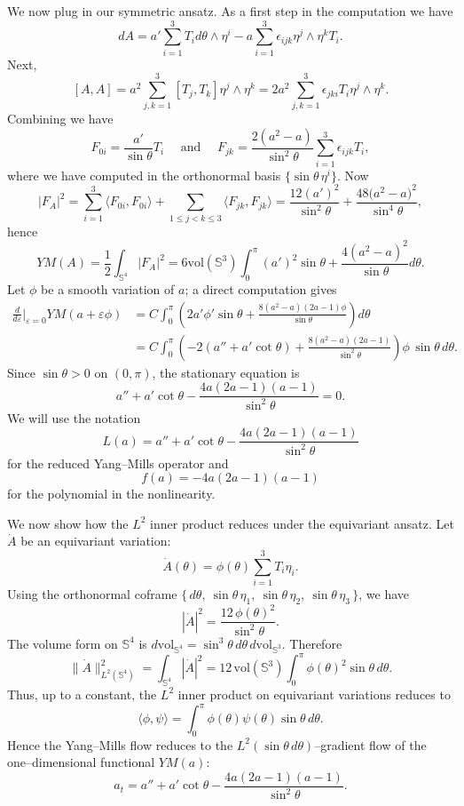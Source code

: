 \documentclass[11pt,a4paper]{article}
\numberwithin{equation}{section}
\theoremstyle{plain}
\theoremstyle{remark}
\begin{document}
We now plug in our symmetric ansatz. As a first step in the computation we have
$$
dA=a'\sum_{i=1}^3T_id\theta\wedge \eta^i-a\sum_{i=1}^3\epsilon_{ijk}\eta^j\wedge\eta^kT_i.
$$
Next,
$$
[A,A]=a^2\sum_{j,k=1}^3[T_j,T_k]\eta^j\wedge \eta^k=2a^2\sum_{j,k=1}^3\epsilon_{jki}T_i\eta^j\wedge\eta^k.
$$
Combining we have 
$$
F_{0i}=\frac{a'}{\sin\theta}T_i\quad\text{ and }\quad F_{jk}=\frac{2(a^2-a)}{\sin^2\theta}\sum_{i=1}^3\epsilon_{ijk}T_i,
$$
where we have computed in the orthonormal basis $\{\sin\theta\,\eta^i\}$. Now
$$
|F_A|^2=\sum_{i=1}^3\langle F_{0i},F_{0i}\rangle+\sum_{1\leq j<k\leq3}\langle F_{jk},F_{jk}\rangle=\frac{12(a')^2}{\sin^2\theta}+\frac{48\bigl(a^2-a\bigr)^2}{\sin^4\theta},
$$
hence
$$
YM(A)=\frac{1}{2}\int_{\mathbb{S}^4}|F_A|^2=6\mathrm{vol}(\mathbb{S}^3)\int_0^\pi(a')^2\sin\theta+\frac{4(a^2-a)^2}{\sin\theta}d\theta.
$$
Let $\phi$ be a smooth variation of $a$; a direct computation gives
\begin{align*}
    \frac{d}{d\varepsilon}\Big|_{\varepsilon=0}
YM(a+\varepsilon\phi)
&=
C\int_0^\pi
\left(
2a'\phi' \sin\theta
+ \frac{8(a^2-a)(2a-1)\phi}{\sin\theta}
\right)
d\theta\\
&=
C\int_0^\pi
\left(
-2(a''+a'\cot\theta)
+ \frac{8(a^2-a)(2a-1)}{\sin^2\theta}
\right)
\phi\, \sin\theta\, d\theta.
\end{align*}
Since $\sin\theta>0$ on $(0,\pi)$, the stationary equation is
\begin{equation}
    a''+a'\cot\theta
- \frac{4a(2a-1)(a-1)}{\sin^2\theta}
=0.    
\end{equation}
We will use the notation 
$$
L(a)=a''+a'\cot\theta-\frac{4a(2a-1)(a-1)}{\sin^2\theta}
$$
for the reduced Yang--Mills operator and 
\begin{equation}\label{nonlinpolyeq}
f(a)=-4a(2a-1)(a-1)
\end{equation}
for the polynomial in the nonlinearity.  

\medskip

We now show how the $L^2$
inner product reduces under the equivariant ansatz. Let $\dot A$ be an equivariant variation:
$$
\dot A(\theta)
=
\phi(\theta)\sum_{i=1}^3 T_i \eta_i.
$$
Using the orthonormal coframe $\{\, d\theta,\ \sin\theta\,\eta_1,\ \sin\theta\,\eta_2,\ \sin\theta\,\eta_3 \,\}$, we have
$$
|\dot A|^2
=
\frac{12\,\phi(\theta)^2}{\sin^2\theta}.
$$
The volume form on $\mathbb{S}^4$ is $d\mathrm{vol}_{\mathbb{S}^4}
=
\sin^3\theta\, d\theta\, d\mathrm{vol}_{\mathbb{S}^3}$. Therefore
$$
\|\dot A\|_{L^2(\mathbb{S}^4)}^2
=
\int_{\mathbb{S}^4} |\dot A|^2
=
12\,\mathrm{vol}(\mathbb{S}^3)
\int_0^\pi
\phi(\theta)^2 \sin\theta\, d\theta.
$$
Thus, up to a constant, the $L^2$ inner product on
equivariant variations reduces to
$$
\langle \phi,\psi\rangle
=
\int_0^\pi
\phi(\theta)\psi(\theta)\sin\theta\, d\theta.
$$
Hence the Yang--Mills flow reduces to the
$L^2(\sin\theta\, d\theta)$–gradient flow of the one–dimensional
functional $YM(a)$:
\begin{equation}\label{thePDE}
a_t
=
a''+a'\cot\theta
- \frac{4a(2a-1)(a-1)}{\sin^2\theta}.    
\end{equation}
\end{document}
